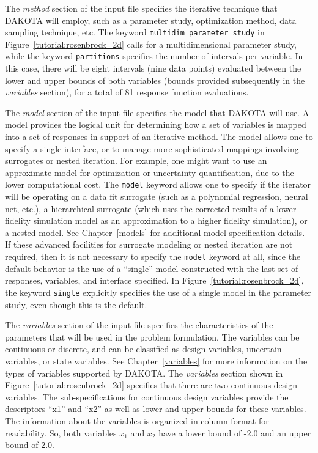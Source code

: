 The \emph{method} section of the input file specifies the iterative
technique that DAKOTA will employ, such as a parameter study,
optimization method, data sampling technique, etc.
The keyword \texttt{multidim\_parameter\_study}
in Figure~\ref{tutorial:rosenbrock_2d} calls for a multidimensional
parameter study, while the keyword \texttt{partitions} specifies the
number of intervals per variable. In this case, there will be eight
intervals (nine data points) evaluated between the lower and upper
bounds of both variables (bounds provided subsequently in the
\emph{variables} section), for a total of 81 response function
evaluations.

The \emph{model} section of the input file specifies the model that
DAKOTA will use.  A model provides the logical unit for determining
how a set of variables is mapped into a set of responses in support of
an iterative method.  The model allows one to specify a single
interface, or to manage more sophisticated mappings involving
surrogates or nested iteration.  For example, one might want to use
an approximate model for optimization or uncertainty quantification,
due to the lower computational cost.  The
\texttt{model} keyword allows one to specify if the iterator will be
operating on a data fit surrogate (such as a polynomial regression,
neural net, etc.), a hierarchical surrogate (which uses the corrected
results of a lower fidelity simulation model as an approximation to a
higher fidelity simulation), or a nested model. See
Chapter~\ref{models} for additional model specification details. If
these advanced facilities for surrogate modeling or nested iteration
are not required, then it is not necessary to specify the
\texttt{model} keyword at all, since the default behavior is the use
of a ``single'' model constructed with the last set of responses,
variables, and interface specified.  In
Figure~\ref{tutorial:rosenbrock_2d}, the keyword \texttt{single}
explicitly specifies the use of a single model in the parameter study,
even though this is the default.

The \emph{variables} section of the input file specifies the
characteristics of the parameters that will be used in the problem
formulation. The variables can be continuous or discrete, and can be
classified as design variables, uncertain variables, or state
variables. See Chapter~\ref{variables} for more information on the
types of variables supported by DAKOTA.  The \emph{variables} section
shown in Figure~\ref{tutorial:rosenbrock_2d} specifies that there are
two continuous design variables.  The sub-specifications for
continuous design variables
provide the descriptors ``x1'' and ``x2'' as well as lower
and upper bounds for these variables. The information about the
variables is organized in column format for readability. So, both
variables $x_1$ and $x_2$ have a lower bound of -2.0 and an upper
bound of 2.0.

